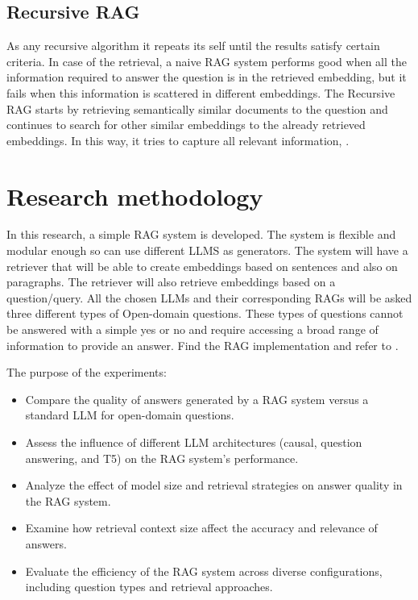 \documentclass{wseas}
\begin{document}
\subsection{Recursive RAG}

As any recursive algorithm it repeats its self until the results
satisfy certain criteria. In case of the retrieval, a naive RAG system
performs good when all the information required to answer the
question is in the retrieved embedding, but it fails when this
information is scattered in different embeddings. The Recursive RAG starts 
by retrieving semantically similar documents to the question and continues 
to search for other similar embeddings to the already retrieved embeddings.
In this way, it tries to capture all relevant information, \cite{website_PondhouseGuideOnAdvancedRAG}.

\section{Research methodology}

In this research, a simple RAG system is developed. The system is
flexible and modular enough so can use different LLMS as generators. The
system will have a retriever that will be able to create embeddings
based on sentences and also on paragraphs. The retriever will also
retrieve embeddings based on a question/query. All the chosen LLMs and
their corresponding RAGs will be asked three different types of Open-domain
questions. These types of questions cannot be answered with a simple 
yes or no and require accessing a broad range of information to provide an answer. 
Find the RAG implementation and refer to \cite{cite_github_solution}.

The purpose of the experiments: 
\begin{itemize}
  \item Compare the quality of answers generated by a RAG system versus a standard LLM for open-domain questions.
  \item Assess the influence of different LLM architectures (causal, question answering, and T5) on the RAG system's performance.
  \item Analyze the effect of model size and retrieval strategies on answer quality in the RAG system.
  \item Examine how retrieval context size affect the accuracy and relevance of answers.
  \item Evaluate the efficiency of the RAG system across diverse configurations, including question types and retrieval approaches.
\end{itemize}
\end{document}
